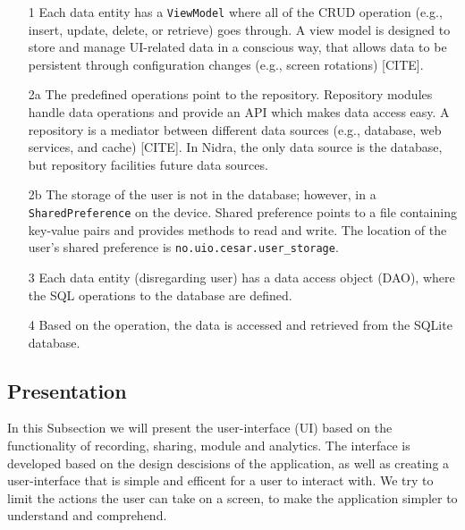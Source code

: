 \begin{itemize}
	\item[1] Each data entity has a \verb|ViewModel| where all of the CRUD operation (e.g., insert, update, delete, or retrieve) goes through.  A view model is designed to store and manage UI-related data in a conscious way, that allows data to be persistent through configuration changes (e.g., screen rotations) [CITE]. 
 	\item[2a] The predefined operations point to the repository. Repository modules handle data operations and provide an API  which makes data access easy. A repository is a mediator between different data sources (e.g., database, web services, and cache) [CITE]. In Nidra, the only data source is the database, but repository facilities future data sources. 
	\item[2b] The storage of the user is not in the database; however, in a \verb|SharedPreference| on the device. Shared preference points to a file containing key-value pairs and provides methods to read and write. The location of the user's shared preference is \verb|no.uio.cesar.user_storage|. 
	\item[3] Each data entity (disregarding user) has a data access object (DAO), where the SQL operations to the database are defined. 
	\item[4] Based on the operation, the data is accessed and retrieved from the SQLite database.
\end{itemize}


\subsection{Presentation}
In this Subsection we will present the user-interface (UI) based on the functionality of recording, sharing, module and analytics. The interface is developed based on the design descisions of the application, as well as creating a user-interface that is simple and efficent for a user to interact with. We try to limit the actions the user can take on a screen, to make the application simpler to understand and comprehend. 

